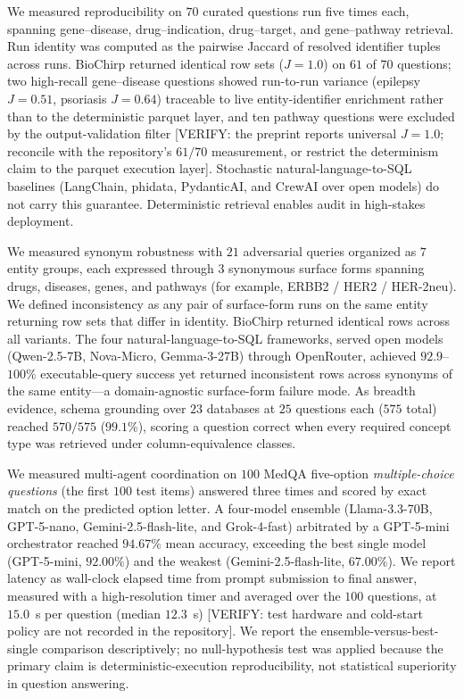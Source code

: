 We measured reproducibility on $70$ curated questions run five times each, spanning gene--disease, drug--indication, drug--target, and gene--pathway retrieval. Run identity was computed as the pairwise Jaccard of resolved identifier tuples across runs. BioChirp returned identical row sets ($J = 1.0$) on $61$ of $70$ questions; two high-recall gene--disease questions showed run-to-run variance (epilepsy $J = 0.51$, psoriasis $J = 0.64$) traceable to live entity-identifier enrichment rather than to the deterministic parquet layer, and ten pathway questions were excluded by the output-validation filter [VERIFY: the preprint reports universal $J = 1.0$; reconcile with the repository's $61/70$ measurement, or restrict the determinism claim to the parquet execution layer]. Stochastic natural-language-to-SQL baselines (LangChain, phidata, PydanticAI, and CrewAI over open models) do not carry this guarantee. Deterministic retrieval enables audit in high-stakes deployment.

We measured synonym robustness with $21$ adversarial queries organized as $7$ entity groups, each expressed through $3$ synonymous surface forms spanning drugs, diseases, genes, and pathways (for example, ERBB2 / HER2 / HER-2neu). We defined inconsistency as any pair of surface-form runs on the same entity returning row sets that differ in identity. BioChirp returned identical rows across all variants. The four natural-language-to-SQL frameworks, served open models (Qwen-2.5-7B, Nova-Micro, Gemma-3-27B) through OpenRouter, achieved $92.9$--$100\%$ executable-query success yet returned inconsistent rows across synonyms of the same entity---a domain-agnostic surface-form failure mode. As breadth evidence, schema grounding over $23$ databases at $25$ questions each ($575$ total) reached $570/575$ ($99.1\%$), scoring a question correct when every required concept type was retrieved under column-equivalence classes.

We measured multi-agent coordination on $100$ MedQA five-option \textit{multiple-choice questions} (the first $100$ test items) answered three times and scored by exact match on the predicted option letter. A four-model ensemble (Llama-3.3-70B, GPT-5-nano, Gemini-2.5-flash-lite, and Grok-4-fast) arbitrated by a GPT-5-mini orchestrator reached $94.67\%$ mean accuracy, exceeding the best single model (GPT-5-mini, $92.00\%$) and the weakest (Gemini-2.5-flash-lite, $67.00\%$). We report latency as wall-clock elapsed time from prompt submission to final answer, measured with a high-resolution timer and averaged over the $100$ questions, at $15.0$~s per question (median $12.3$~s) [VERIFY: test hardware and cold-start policy are not recorded in the repository]. We report the ensemble-versus-best-single comparison descriptively; no null-hypothesis test was applied because the primary claim is deterministic-execution reproducibility, not statistical superiority in question answering.

